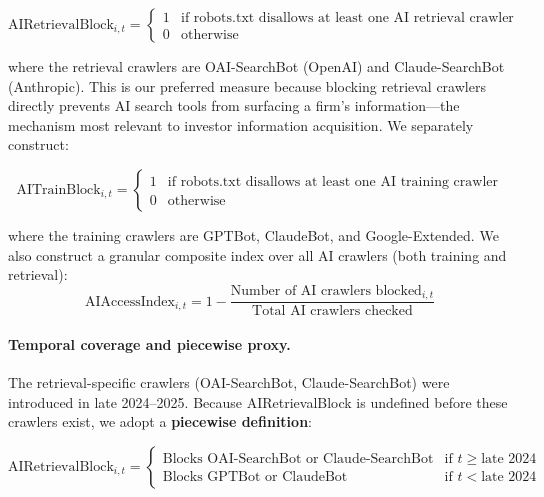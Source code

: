 \documentclass[12pt,a4paper]{article}
\begin{document}
\begin{equation}
\text{AIRetrievalBlock}_{i,t} = \begin{cases} 1 & \text{if robots.txt disallows at least one AI retrieval crawler} \\ 0 & \text{otherwise} \end{cases}
\end{equation}

\noindent where the retrieval crawlers are OAI-SearchBot (OpenAI) and Claude-SearchBot (Anthropic). This is our preferred measure because blocking retrieval crawlers directly prevents AI search tools from surfacing a firm's information---the mechanism most relevant to investor information acquisition. We separately construct:

\begin{equation}
\text{AITrainBlock}_{i,t} = \begin{cases} 1 & \text{if robots.txt disallows at least one AI training crawler} \\ 0 & \text{otherwise} \end{cases}
\end{equation}

\noindent where the training crawlers are GPTBot, ClaudeBot, and Google-Extended. We also construct a granular composite index over all AI crawlers (both training and retrieval):
\begin{equation}
\text{AIAccessIndex}_{i,t} = 1 - \frac{\text{Number of AI crawlers blocked}_{i,t}}{\text{Total AI crawlers checked}}
\end{equation}

\paragraph{Temporal coverage and piecewise proxy.} The retrieval-specific crawlers (OAI-SearchBot, Claude-SearchBot) were introduced in late 2024--2025. Because AIRetrievalBlock is undefined before these crawlers exist, we adopt a \textbf{piecewise definition}:

\begin{equation}
\text{AIRetrievalBlock}_{i,t} = \begin{cases}
\text{Blocks OAI-SearchBot or Claude-SearchBot} & \text{if } t \geq \text{late 2024} \\[4pt]
\text{Blocks GPTBot or ClaudeBot} & \text{if } t < \text{late 2024}
\end{cases}
\end{equation}
\end{document}
